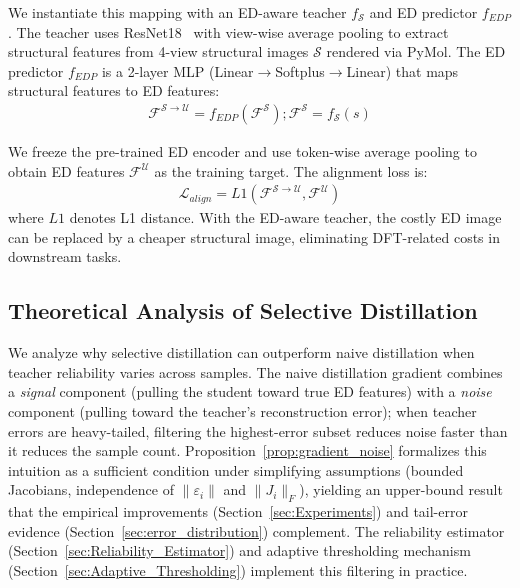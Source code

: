 We instantiate this mapping with an ED-aware teacher $f_{\mathcal{S}}$ and ED predictor $f_{EDP}$. The teacher uses ResNet18~\cite{he2016deep} with view-wise average pooling to extract structural features from 4-view structural images $\mathcal{S}$ rendered via PyMol. The ED predictor $f_{EDP}$ is a 2-layer MLP (Linear$\rightarrow$Softplus$\rightarrow$Linear) that maps structural features to ED features:
\begin{align}
\label{Formula_F_S_U_and_F_S}
\mathcal{F}^{\mathcal{S}\rightarrow\mathcal{U}}=f_{EDP}(\mathcal{F}^{\mathcal{S}}); \mathcal{F}^{\mathcal{S}}=f_{\mathcal{S}}(s)
\end{align}

We freeze the pre-trained ED encoder and use token-wise average pooling to obtain ED features $\mathcal{F}^{\mathcal{U}}$ as the training target. The alignment loss is:
\begin{align}
\label{Formula_L_align}
\mathcal{L}_{align}=L1(\mathcal{F}^{\mathcal{S}\rightarrow\mathcal{U}}, \mathcal{F}^{\mathcal{U}})
\end{align}
where $L1$ denotes L1 distance. With the ED-aware teacher, the costly ED image can be replaced by a cheaper structural image, eliminating DFT-related costs in downstream tasks.

\subsection{Theoretical Analysis of Selective Distillation}
\label{sec:Theoretical_Analysis}

We analyze why selective distillation can outperform naive distillation when teacher reliability varies across samples. The naive distillation gradient combines a \emph{signal} component (pulling the student toward true ED features) with a \emph{noise} component (pulling toward the teacher's reconstruction error); when teacher errors are heavy-tailed, filtering the highest-error subset reduces noise faster than it reduces the sample count. Proposition~\ref{prop:gradient_noise} formalizes this intuition as a sufficient condition under simplifying assumptions (bounded Jacobians, independence of $\|\varepsilon_i\|$ and $\|J_i\|_F$), yielding an upper-bound result that the empirical improvements (Section~\ref{sec:Experiments}) and tail-error evidence (Section~\ref{sec:error_distribution}) complement. The reliability estimator (Section~\ref{sec:Reliability_Estimator}) and adaptive thresholding mechanism (Section~\ref{sec:Adaptive_Thresholding}) implement this filtering in practice.

